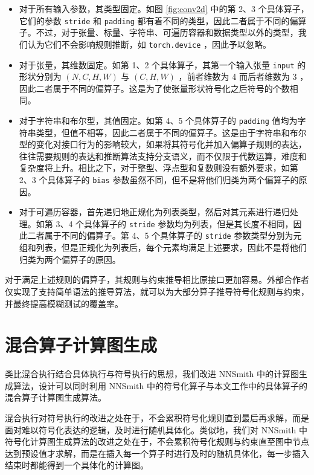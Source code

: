 \begin{itemize}
    \item 对于所有输入参数，其类型固定。如图 \ref{fig:conv2d} 中的第 2、3 个具体算子，它们的参数 \texttt{stride} 和 \texttt{padding} 都有着不同的类型，因此二者属于不同的偏算子。不过，对于张量、标量、字符串、可遍历容器和数据类型以外的类型，我们认为它们不会影响规则推断，如 \texttt{torch.device} ，因此予以忽略。
    \item 对于张量，其维数固定。如第 1、2 个具体算子，其第一个输入张量 \texttt{input} 的形状分别为 $(N, C, H, W)$ 与 $(C, H, W)$ ，前者维数为 4 而后者维数为 3 ，因此二者属于不同的偏算子。这是为了使张量形状符号化之后符号的个数相同。
    \item 对于字符串和布尔型，其值固定。如第 4、5 个具体算子的 \texttt{padding} 值均为字符串类型，但值不相等，因此二者属于不同的偏算子。这是由于字符串和布尔型的变化对接口行为的影响较大，如果将其符号化并加入偏算子规则的表达，往往需要规则的表达和推断算法支持分支语义，而不仅限于代数运算，难度和复杂度将上升。相比之下，对于整型、浮点型和复数则没有额外要求，如第 2、3 个具体算子的 \texttt{bias} 参数虽然不同，但不是将他们归类为两个偏算子的原因。
    \item 对于可遍历容器，首先递归地正规化为列表类型，然后对其元素进行递归处理。如第 3、4 个具体算子的 \texttt{stride} 参数均为列表，但是其长度不相同，因此二者属于不同的偏算子。第 4、5 个具体算子的 \texttt{stride} 参数类型分别为元组和列表，但是正规化为列表后，每个元素均满足上述要求，因此不是将他们归类为两个偏算子的原因。
\end{itemize}
对于满足上述规则的偏算子，其规则与约束推导相比原接口更加容易。外部合作者仅实现了支持简单语法的推导算法，就可以为大部分算子推导符号化规则与约束，并最终提高模糊测试的覆盖率。

\section{混合算子计算图生成}

类比混合执行结合具体执行与符号执行的思想，我们改进 NNSmith 中的计算图生成算法，设计可以同时利用 NNSmith 中的符号化算子与本文工作中的具体算子的混合算子计算图生成算法。

混合执行对符号执行的改进之处在于，不会累积符号化规则直到最后再求解，而是面对难以符号化表达的逻辑，及时进行随机具体化。类似地，我们对 NNSmith 中符号化计算图生成算法的改进之处在于，不会累积符号化规则与约束直至图中节点达到预设值才求解，而是在插入每一个算子时进行及时的随机具体化，每一步插入结束时都能得到一个具体化的计算图。

